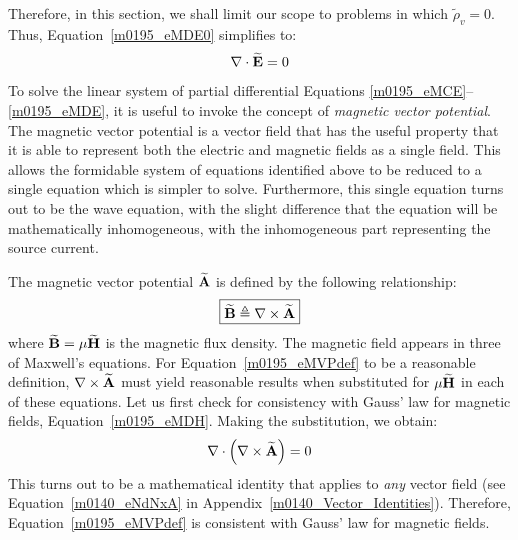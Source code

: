 Therefore, in this section, we shall limit our scope to problems in which $\widetilde{\rho}_v=0$. 
Thus, Equation~\ref{m0195_eMDE0} simplifies to:
%
\begin{equation}
\nabla \cdot \widetilde{\bf E} = 0
\label{m0195_eMDE}
\end{equation}
%
To solve the linear system of partial differential Equations \ref{m0195_eMCE}--\ref{m0195_eMDE}, it is useful to invoke the concept of \emph{magnetic vector potential}.
The magnetic vector potential is a vector field that has the useful property that it is able to represent both the electric and magnetic fields as a single field.
This allows the formidable system of equations identified above to be reduced to a single equation which is simpler to solve.
Furthermore, this single equation turns out to be the wave equation, 
with the slight difference that the equation will be mathematically inhomogeneous, with the inhomogeneous part representing the source current.

The magnetic vector potential $\widetilde{\bf A}$ is defined by the following relationship:
%
\begin{equation}
\boxed{
\widetilde{\bf B} \triangleq \nabla \times \widetilde{\bf A}
}
\label{m0195_eMVPdef}
\end{equation}
%
where $\widetilde{\bf B}=\mu\widetilde{\bf H}$ is the magnetic flux density.
The magnetic field appears in three of Maxwell's equations. 
For Equation~\ref{m0195_eMVPdef} to be a reasonable definition, $\nabla \times \widetilde{\bf A}$ must yield reasonable results when substituted for $\mu\widetilde{\bf H}$ in each of these equations.
Let us first check for consistency with Gauss' law for magnetic fields,
Equation~\ref{m0195_eMDH}.
Making the substitution, we obtain:
%
\begin{equation}
\nabla \cdot  \left( \nabla \times \widetilde{\bf A} \right) = 0
\end{equation}
%
This turns out to be a mathematical identity that applies to \emph{any} vector field (see Equation~\ref{m0140_eNdNxA} in Appendix~\ref{m0140_Vector_Identities}).
Therefore, Equation~\ref{m0195_eMVPdef} is consistent with Gauss' law for magnetic fields.

